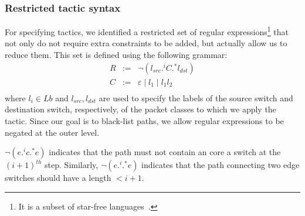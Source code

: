 \subsubsection{Restricted tactic syntax} 
For specifying tactics, we identified a restricted set of regular expressions\footnote{
	It is a subset of star-free languages~\cite{starfree}.}
 that not only do not require extra constraints to be added,
but actually allow us to reduce them.
This set is defined using the following grammar:
$$\begin{array}{rcl}
R  &  :=  &  \neg (l_{src} .^i C .^* l_{dst}) \\
C  &  :=  &  \varepsilon \mid l_1 \mid l_1 l_2\\
\end{array}$$
where $l_i\in Lb$ and $l_{src}, l_{dst}$ are used to specify the labels of the source switch 
and destination switch, respectively, of the packet classes to which we apply the tactic. 
Since our goal is to black-list paths, we allow regular expressions to be negated at the outer level. 
\begin{example}
 $\neg (e .^i c .^* e)$ indicates that the path must not contain an core a switch at the $(i+1)^{th}$ step. 
 Similarly, $\neg (e .^i .^* e)$ indicates that the path connecting two edge switches should have a length $ < i + 1$. 
\end{example}


